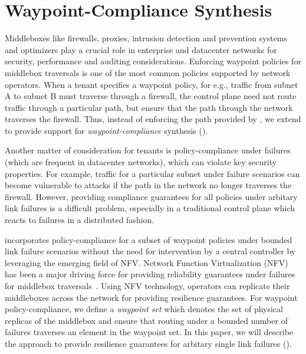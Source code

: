 \section{Waypoint-Compliance Synthesis}
Middleboxes like firewalls,
proxies, intrusion detection and prevention systems and 
optimizers play a crucial role in enterprise and
datacenter networks for security, performance 
and auditing considerations. Enforcing waypoint policies for
middlebox traversals is one of the most common policies 
supported by network operators. When a 
tenant specifies a waypoint policy, 
for e.g., traffic from
subnet A to subnet B must traverse 
through a firewall, the control plane need not
route traffic through a particular path, but ensure
that the path through the network traverses the firewall. 
Thus, instead of enforcing the path provided by \genesis,
we extend \name to provide support for \emph{waypoint-compliance}
synthesis (). 

Another matter of consideration for tenants is 
policy-compliance under failures (which are frequent in 
datacenter networks), which can violate key security 
properties. For example, 
traffic for a particular subnet under 
failure scenarios can become vulnerable to attacks if the 
path in the network no longer traverses the firewall. 
However, providing compliance 
guarantees for all policies
under arbitary link failures is a difficult problem, 
especially in a traditional control plane 
which reacts to failures in a distributed fashion. 

\name incorporates policy-compliance
for a subset of waypoint policies 
under bounded link failure scenarios without the 
need for intervention by a central controller by 
leveraging the emerging field of NFV. 
Network Function Virtualization (NFV) has been a 
major driving force for providing reliability 
guarantees under failures  
for middlebox traversals~\cite{opennf, netbricks}. 
Using NFV technology, operators can replicate 
their middleboxes across the network for providing 
resilience guarantees. For waypoint policy-compliance, 
we define a \emph{waypoint set} 
which denotes the set of physical replicas of the 
middlebox and ensure that routing under a bounded 
number of failures traverses an element in the waypoint
set. In this paper, we will describe the approach to  
provide resilience guarantees for arbitary single
link failures ().


